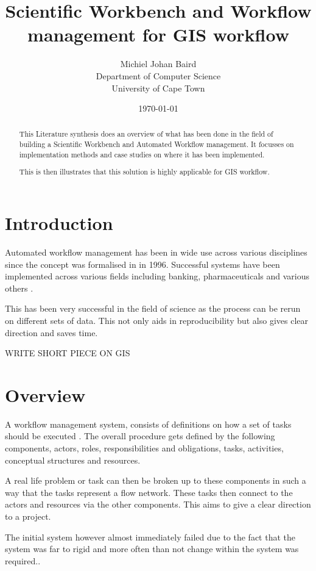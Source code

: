 \documentclass[11pt,twocolumn]{article}
\title{Scientific Workbench and Workflow management for GIS workflow}
\author{
    Michiel Johan Baird \\
        Department of Computer Science \\
        University of Cape Town
}
\date{\today}
\begin{document}
\maketitle
\begin{abstract}
    This Literature synthesis does an overview of what has been done
    in the field of building a Scientific Workbench and Automated
    Workflow management. It focusses on implementation methods and
    case studies on where it has been implemented.

    This is then illustrates that this solution is highly applicable
    for GIS workflow.
\end{abstract}
\section{Introduction}
    Automated workflow management has been in wide use across
    various disciplines since the concept was formalised in in
    1996\cite{springerlink:10.1007/BF00136712}. Successful systems
    have been implemented across various fields including banking,
    pharmaceuticals and various others
    \cite{Brahe:2007:SWW:1316624.1316661,5407993}.

    This has been very successful in the field of science as
    the process can be rerun on different sets of data.\cite{4721191}
    This not only aids in reproducibility but also gives
    clear direction and saves time.

    WRITE SHORT PIECE ON GIS

\section{Overview}
    A workflow management system, consists of definitions
    on how a set of tasks should be executed
    \cite{springerlink:10.1007/BF00136712,vanderAalst2002125}.
    The overall procedure gets defined by the following
    components, actors, roles, responsibilities and
    obligations, tasks, activities, conceptual structures
    and resources.

    A real life problem or task can then be broken up to these
    components in such a way that the tasks represent a flow
    network. These tasks then connect to the actors and resources
    via the other components\cite[p.~4]{Taylor:2006:WES:1196459}.
    This aims to give a clear direction to a project.

    The initial system however almost immediately failed
    due to the fact that the system was far to rigid and
    more often than not change within the system was
    required.\cite{Suchman:1983:OPP:357442.357445}.
\end{document}

